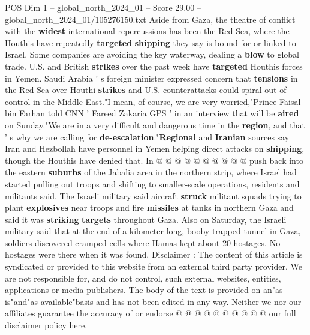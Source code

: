 \begin{textsample}{POS Dim 1 – global\_north\_2024\_01 – Score 29.00 – global\_north\_2024\_01/105276150.txt}
Aside from Gaza, the theatre of conflict with the \textbf{widest} international repercussions has been the Red Sea, where the Houthis have repeatedly \textbf{targeted} \textbf{shipping} they say is bound for or linked to Israel.
Some companies are avoiding the key waterway, dealing a \textbf{blow} to global trade.
U.S. and British \textbf{strikes} over the past week have \textbf{targeted} Houthis forces in Yemen.
Saudi Arabia ' s foreign minister expressed concern that \textbf{tensions} in the Red Sea over Houthi \textbf{strikes} and U.S. counterattacks could spiral out of control in the Middle East."I mean, of course, we are very worried,"Prince Faisal bin Farhan told CNN ' Fareed Zakaria GPS ' in an interview that will be \textbf{aired} on Sunday."We are in a very difficult and dangerous time in the \textbf{region}, and that ' s why we are calling for \textbf{de-escalation}."\textbf{Regional} and \textbf{Iranian} sources say Iran and Hezbollah have personnel in Yemen helping direct attacks on \textbf{shipping}, though the Houthis have denied that.
In @ @ @ @ @ @ @ @ @ @ push back into the eastern \textbf{suburbs} of the Jabalia area in the northern strip, where Israel had started pulling out troops and shifting to smaller-scale operations, residents and militants said.
The Israeli military said aircraft \textbf{struck} militant squads trying to plant \textbf{explosives} near troops and fire \textbf{missiles} at tanks in northern Gaza and said it was \textbf{striking} \textbf{targets} throughout Gaza.
Also on Saturday, the Israeli military said that at the end of a kilometer-long, booby-trapped tunnel in Gaza, soldiers discovered cramped cells where Hamas kept about 20 hostages.
No hostages were there when it was found.
Disclaimer : The content of this article is syndicated or provided to this website from an external third party provider.
We are not responsible for, and do not control, such external websites, entities, applications or media publishers.
The body of the text is provided on an"as is"and"as available"basis and has not been edited in any way.
Neither we nor our affiliates guarantee the accuracy of or endorse @ @ @ @ @ @ @ @ @ @ our full disclaimer policy here.

\end{textsample}
